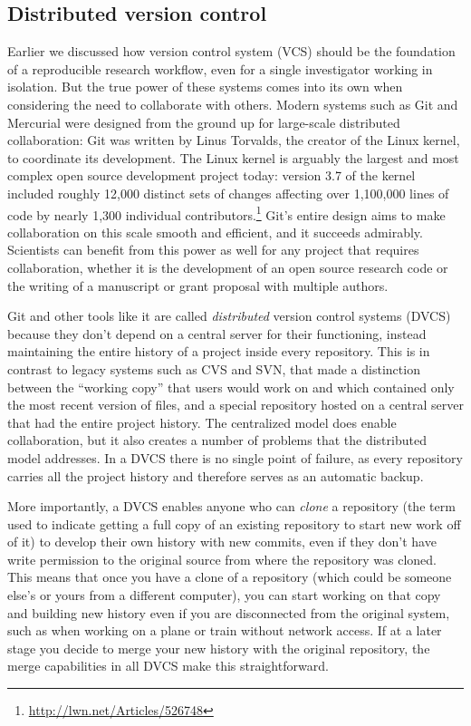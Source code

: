 \documentclass[11pt,oneside,english]{article}
\begin{document}
\subsection{Distributed version control}

Earlier we discussed how version control system (VCS) should be the foundation
of a reproducible research workflow, even for a single investigator working in
isolation.  But the true power of these systems comes into its own when
considering the need to collaborate with others.  Modern systems such as Git
and Mercurial were designed from the ground up for large-scale distributed
collaboration: Git was written by Linus Torvalds, the creator of the Linux
kernel, to coordinate its development.  The Linux kernel is arguably the
largest and most complex open source development project today: version
3.7 of the kernel included roughly 12,000 distinct sets of changes affecting
over 1,100,000 lines of code by nearly 1,300 individual
contributors.\footnote{\url{http://lwn.net/Articles/526748}}  Git's entire
design aims to make collaboration on this scale smooth and efficient, and it
succeeds admirably.  Scientists can benefit from this power as well
for any project that requires collaboration, whether it is the development of
an open source research code or the writing of a manuscript or grant proposal
with multiple authors.

Git and other tools like it are called \emph{distributed} version control
systems (DVCS) because they don't depend on a central server for their
functioning, instead maintaining the entire history of a project inside every
repository.  This is in contrast to legacy systems such as CVS and SVN, that
made a distinction between the ``working copy'' that users would work on and
which contained only the most recent version of files, and a special repository
hosted on a central server that had the entire project history.  The
centralized model does enable collaboration, but it also creates a number of
problems that the distributed model addresses.  In a DVCS there is no single
point of failure, as every repository carries all the project history and
therefore serves as an automatic backup.

More importantly, a DVCS enables anyone who can \emph{clone} a repository (the
term used to indicate getting a full copy of an existing repository to start
new work off of it) to develop their own history with new commits, even if they
don't have write permission to the original source from where the repository
was cloned.  This means that once you have a clone of a repository (which could
be someone else's or yours from a different computer), you can start working on
that copy and building new history even if you are disconnected from the
original system, such as when working on a plane or train without network
access.  If at a later stage you decide to merge your new history with the
original repository, the merge capabilities in all DVCS make this
straightforward.
\end{document}
